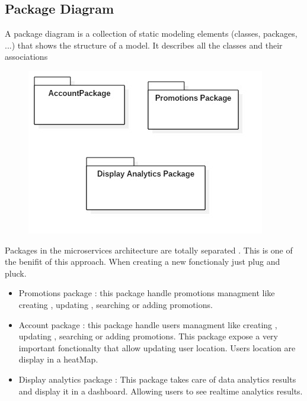 \subsection{ Package Diagram}
A package diagram is a collection of static modeling elements (classes, packages, ...) that shows the structure of a model. It describes all the classes and their associations
\begin{figure}[h!]
	\centering
	\includegraphics[height=0.3\textheight]{fig01/packagediagram}
	\label{fig:FilialesEtClients}
\end{figure}
Packages in the microservices architecture are totally separated . This is one of the benifit of this approach.
When creating a new fonctionaly just plug and pluck.
 \begin{itemize}
	\item Promotions package : this package handle promotions managment like creating , updating , searching or adding promotions.
	\item Account package : this package handle users managment like creating , updating , searching or adding promotions. This package
	expose a very important fonctionalty that allow updating user location. Users location are display in a heatMap. 
	\item Display analytics package : This package takes care of data analytics results and display it in a dashboard. Allowing
	users to see realtime analytics results.
\end{itemize}


